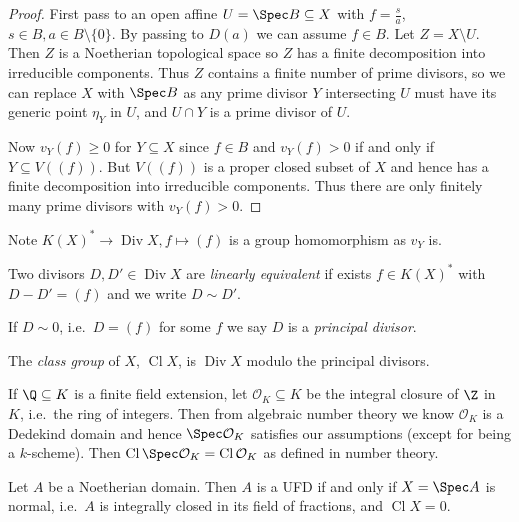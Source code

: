 \documentclass[a4paper]{article}
\newcommand{\sh}[1]{\mathcal{#1}} %
\DeclareMathOperator{\Div}{Div} %
\DeclareMathOperator{\Cl}{Cl} %
\begin{document}
\begin{proof}
  First pass to an open affine \(U = \Spec B \subseteq X\) with \(f = \frac{s}{a}\), \(s \in B, a \in B\setminus \{0\}\). By passing to \(D(a)\) we can assume \(f \in B\). Let \(Z = X \setminus U\). Then \(Z\) is a Noetherian topological space so \(Z\) has a finite decomposition into irreducible components. Thus \(Z\) contains a finite number of prime divisors, so we can replace \(X\) with \(\Spec B\) as any prime divisor \(Y\) intersecting \(U\) must have its generic point \(\eta_Y\) in \(U\), and \(U \cap Y\) is a prime divisor of \(U\).

  Now \(v_Y(f) \geq 0\) for \(Y \subseteq X\) since \(f \in B\) and \(v_Y(f) > 0\) if and only if \(Y \subseteq V((f))\). But \(V((f))\) is a proper closed subset of \(X\) and hence has a finite decomposition into irreducible components. Thus there are only finitely many prime divisors with \(v_Y(f) > 0\).
\end{proof}

Note \(K(X)^* \to \Div X, f \mapsto (f)\) is a group homomorphism as \(v_Y\) is.

\begin{definition}
  Two divisors \(D, D' \in \Div X\) are \emph{linearly equivalent} if exists \(f \in K(X)^*\) with \(D - D' = (f)\) and we write \(D \sim D'\).

  If \(D \sim 0\), i.e.\ \(D = (f)\) for some \(f\) we say \(D\) is a \emph{principal divisor}.
\end{definition}

\begin{definition}
  The \emph{class group} of \(X\), \(\Cl X\), is \(\Div X\) modulo the principal divisors.
\end{definition}

\begin{remark}
  If \(\Q \subseteq K\) is a finite field extension, let \(\sh O_K \subseteq K\) be the integral closure of \(\Z\) in \(K\), i.e.\ the ring of integers. Then from algebraic number theory we know \(\sh O_K\) is a Dedekind domain and hence \(\Spec \sh O_K\) satisfies our assumptions (except for being a \(k\)-scheme). Then \(\Cl \Spec \sh O_K = \Cl \sh O_K\) as defined in number theory.
\end{remark}

\begin{theorem}
  Let \(A\) be a Noetherian domain. Then \(A\) is a UFD if and only if \(X = \Spec A\) is normal, i.e.\ \(A\) is integrally closed in its field of fractions, and \(\Cl X = 0\).
\end{theorem}
\end{document}
